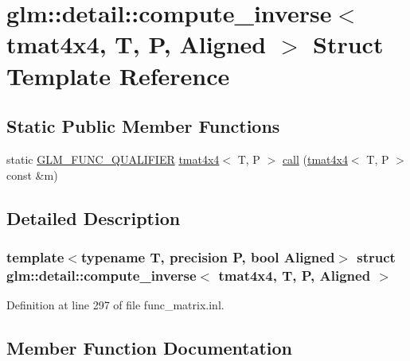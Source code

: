 \hypertarget{structglm_1_1detail_1_1compute__inverse_3_01tmat4x4_00_01_t_00_01_p_00_01_aligned_01_4}{}\section{glm\+::detail\+::compute\+\_\+inverse$<$ tmat4x4, T, P, Aligned $>$ Struct Template Reference}
\label{structglm_1_1detail_1_1compute__inverse_3_01tmat4x4_00_01_t_00_01_p_00_01_aligned_01_4}
\subsection*{Static Public Member Functions}
\begin{DoxyCompactItemize}
\item 
static \mbox{\hyperlink{setup_8hpp_a33fdea6f91c5f834105f7415e2a64407}{G\+L\+M\+\_\+\+F\+U\+N\+C\+\_\+\+Q\+U\+A\+L\+I\+F\+I\+ER}} \mbox{\hyperlink{structglm_1_1tmat4x4}{tmat4x4}}$<$ T, P $>$ \mbox{\hyperlink{structglm_1_1detail_1_1compute__inverse_3_01tmat4x4_00_01_t_00_01_p_00_01_aligned_01_4_a79c42e7b3559a548ea78b8529611745d}{call}} (\mbox{\hyperlink{structglm_1_1tmat4x4}{tmat4x4}}$<$ T, P $>$ const \&m)
\end{DoxyCompactItemize}


\subsection{Detailed Description}
\subsubsection*{template$<$typename T, precision P, bool Aligned$>$\newline
struct glm\+::detail\+::compute\+\_\+inverse$<$ tmat4x4, T, P, Aligned $>$}



Definition at line 297 of file func\+\_\+matrix.\+inl.



\subsection{Member Function Documentation}
\mbox{\label{structglm_1_1detail_1_1compute__inverse_3_01tmat4x4_00_01_t_00_01_p_00_01_aligned_01_4_a79c42e7b3559a548ea78b8529611745d}} 
